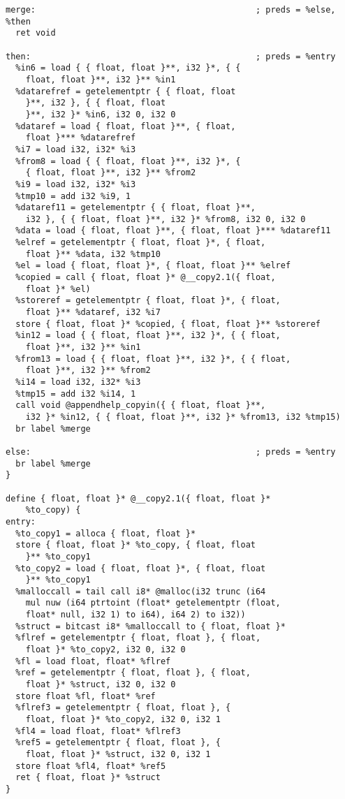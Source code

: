 \documentclass[main.tex]{subfiles}
\begin{document}
{\begin{lstlisting}
merge:                                            ; preds = %else, %then
  ret void

then:                                             ; preds = %entry
  %in6 = load { { float, float }**, i32 }*, { { 
    float, float }**, i32 }** %in1
  %datarefref = getelementptr { { float, float 
    }**, i32 }, { { float, float 
    }**, i32 }* %in6, i32 0, i32 0
  %dataref = load { float, float }**, { float, 
    float }*** %datarefref
  %i7 = load i32, i32* %i3
  %from8 = load { { float, float }**, i32 }*, {
    { float, float }**, i32 }** %from2
  %i9 = load i32, i32* %i3
  %tmp10 = add i32 %i9, 1
  %dataref11 = getelementptr { { float, float }**, 
    i32 }, { { float, float }**, i32 }* %from8, i32 0, i32 0
  %data = load { float, float }**, { float, float }*** %dataref11
  %elref = getelementptr { float, float }*, { float, 
    float }** %data, i32 %tmp10
  %el = load { float, float }*, { float, float }** %elref
  %copied = call { float, float }* @__copy2.1({ float,
    float }* %el)
  %storeref = getelementptr { float, float }*, { float,
    float }** %dataref, i32 %i7
  store { float, float }* %copied, { float, float }** %storeref
  %in12 = load { { float, float }**, i32 }*, { { float,
    float }**, i32 }** %in1
  %from13 = load { { float, float }**, i32 }*, { { float,
    float }**, i32 }** %from2
  %i14 = load i32, i32* %i3
  %tmp15 = add i32 %i14, 1
  call void @appendhelp_copyin({ { float, float }**,
    i32 }* %in12, { { float, float }**, i32 }* %from13, i32 %tmp15)
  br label %merge

else:                                             ; preds = %entry
  br label %merge
}

define { float, float }* @__copy2.1({ float, float }*
    %to_copy) {
entry:
  %to_copy1 = alloca { float, float }*
  store { float, float }* %to_copy, { float, float 
    }** %to_copy1
  %to_copy2 = load { float, float }*, { float, float 
    }** %to_copy1
  %malloccall = tail call i8* @malloc(i32 trunc (i64 
    mul nuw (i64 ptrtoint (float* getelementptr (float, 
    float* null, i32 1) to i64), i64 2) to i32))
  %struct = bitcast i8* %malloccall to { float, float }*
  %flref = getelementptr { float, float }, { float,
    float }* %to_copy2, i32 0, i32 0
  %fl = load float, float* %flref
  %ref = getelementptr { float, float }, { float,
    float }* %struct, i32 0, i32 0
  store float %fl, float* %ref
  %flref3 = getelementptr { float, float }, { 
    float, float }* %to_copy2, i32 0, i32 1
  %fl4 = load float, float* %flref3
  %ref5 = getelementptr { float, float }, { 
    float, float }* %struct, i32 0, i32 1
  store float %fl4, float* %ref5
  ret { float, float }* %struct
}


\end{lstlisting}}
\end{document}
